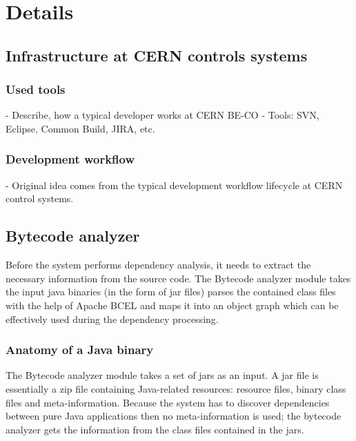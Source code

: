 \chapter{Details}

%
\section{Infrastructure at CERN controls systems}

\subsection{Used tools}
- Describe, how a typical developer works at CERN BE-CO 
- Tools: SVN, Eclipse, Common Build, JIRA, etc. %

\subsection{Development workflow}
- Original idea comes from the typical development workflow lifecycle at CERN
control systems. %

\section{Bytecode analyzer}
Before the system performs dependency analysis, it needs to extract the
necessary information from the source code.
The Bytecode analyzer module takes the input java binaries (in the form of jar
files) parses the contained class files with the help of Apache BCEL and
maps it into an object graph which can be effectively used during the dependency
processing. 
\subsection{Anatomy of a Java binary}
The Bytecode analyzer module takes a set of jars as an input. A jar file is
essentially a zip file containing Java-related resources: resource files, binary
class files and meta-information. Because the system has to discover
dependencies between pure Java applications then no meta-information is used;
the bytecode analyzer gets the information from the class files contained in the
jars.

